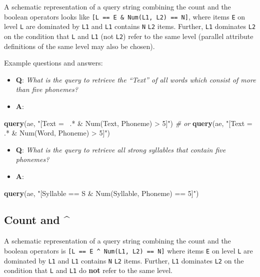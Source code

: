 \documentclass[]{book}
\newenvironment{Shaded}{\begin{snugshade}}{\end{snugshade}}
\newcommand{\CommentTok}[1]{\textcolor[rgb]{0.56,0.35,0.01}{\textit{#1}}}
\newcommand{\KeywordTok}[1]{\textcolor[rgb]{0.13,0.29,0.53}{\textbf{#1}}}
\newcommand{\NormalTok}[1]{#1}
\newcommand{\StringTok}[1]{\textcolor[rgb]{0.31,0.60,0.02}{#1}}
\providecommand{\tightlist}{%
  \setlength{\itemsep}{0pt}\setlength{\parskip}{0pt}}
\theoremstyle{definition}
\theoremstyle{definition}
\theoremstyle{definition}
\theoremstyle{remark}
\begin{document}
A schematic representation of a query string combining the count and the
boolean operators looks like
\texttt{{[}L\ ==\ E\ \&\ Num(L1,\ L2)\ ==\ N{]}}, where items \texttt{E}
on level \texttt{L} are dominated by \texttt{L1} and \texttt{L1}
contains \texttt{N} \texttt{L2} items. Further, \texttt{L1} dominates
\texttt{L2} on the condition that \texttt{L} and \texttt{L1} (not
\texttt{L2}) refer to the same level (parallel attribute definitions of
the same level may also be chosen).

Example questions and answers:

\begin{itemize}
\tightlist
\item
  \textbf{Q}: \emph{What is the query to retrieve the ``Text'' of all
  words which consist of more than five phonemes?}
\item
  \textbf{A}:
\end{itemize}

\begin{Shaded}
\begin{Highlighting}[]
\KeywordTok{query}\NormalTok{(ae, }\StringTok{"[Text =~ .* & Num(Text, Phoneme) > 5]"}\NormalTok{) }
\CommentTok{# or }
\KeywordTok{query}\NormalTok{(ae, }\StringTok{"[Text =~ .* & Num(Word, Phoneme) > 5]"}\NormalTok{)}
\end{Highlighting}
\end{Shaded}

\begin{itemize}
\tightlist
\item
  \textbf{Q}: \emph{What is the query to retrieve all strong syllables
  that contain five phonemes?}
\item
  \textbf{A}:
\end{itemize}

\begin{Shaded}
\begin{Highlighting}[]
\KeywordTok{query}\NormalTok{(ae, }\StringTok{"[Syllable == S & Num(Syllable, Phoneme) == 5]"}\NormalTok{)}
\end{Highlighting}
\end{Shaded}

\hypertarget{count-and}{%
\subsection{Count and \^{}}\label{count-and}}

A schematic representation of a query string combining the count and the
boolean operators is \texttt{{[}L\ ==\ E\ \^{}\ Num(L1,\ L2)\ ==\ N{]}}
where items \texttt{E} on level \texttt{L} are dominated by \texttt{L1}
and \texttt{L1} contains \texttt{N} \texttt{L2} items. Further,
\texttt{L1} dominates \texttt{L2} on the condition that \texttt{L} and
\texttt{L1} do \textbf{not} refer to the same level.
\end{document}
